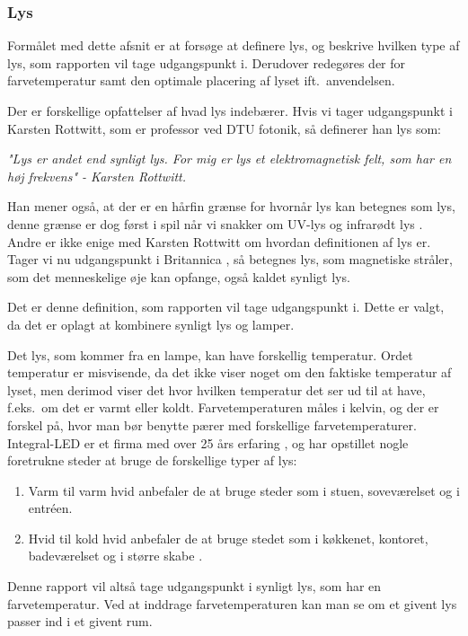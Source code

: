 \subsubsection{Lys}
\label{sec:lys}
Formålet med dette afsnit er at forsøge at definere lys, og beskrive hvilken type af lys, som rapporten vil tage udgangspunkt i. Derudover redegøres der for farvetemperatur samt den optimale placering af lyset ift.\ anvendelsen.


Der er forskellige opfattelser af hvad lys indebærer. Hvis vi tager udgangspunkt i Karsten Rottwitt, som er professor ved DTU fotonik, så definerer han lys som:


\textit{"Lys er andet end synligt lys. For mig er lys et elektromagnetisk felt, som har en høj frekvens"
- Karsten Rottwitt\cite{def_lys}.}

Han mener også, at der er en hårfin grænse for hvornår lys kan betegnes som lys, denne grænse er dog først i spil når vi snakker om UV-lys og infrarødt lys \cite{def_lys}. 
Andre er ikke enige med Karsten Rottwitt om hvordan definitionen af lys er. Tager vi nu udgangspunkt i Britannica \cite{britannica_lys}, så betegnes lys, som magnetiske stråler, som det menneskelige øje kan opfange, også kaldet synligt lys. 


Det er denne definition, som rapporten vil tage udgangspunkt i. Dette er valgt, da det er oplagt at kombinere synligt lys og lamper.

Det lys, som kommer fra en lampe, kan have forskellig temperatur. Ordet temperatur er misvisende, da det ikke viser noget om den faktiske temperatur af lyset, men derimod viser det hvor hvilken temperatur det ser ud til at have, f.eks.\ om det er varmt eller koldt. Farvetemperaturen måles i kelvin, og der er forskel på, hvor man bør benytte pærer med forskellige farvetemperaturer. Integral-LED er et firma med over 25 års erfaring \cite{integral_led}, og har opstillet nogle foretrukne steder at bruge de forskellige typer af lys:

\begin{enumerate}
\item Varm til varm hvid anbefaler de at bruge steder som i stuen, soveværelset og i entréen.
\item Hvid til kold hvid anbefaler de at bruge stedet som i køkkenet, kontoret, badeværelset og i større skabe \cite{varm_kold}.
\end{enumerate}

Denne rapport vil altså tage udgangspunkt i synligt lys, som har en farvetemperatur. Ved at inddrage farvetemperaturen kan man se om et givent lys passer ind i et givent rum.